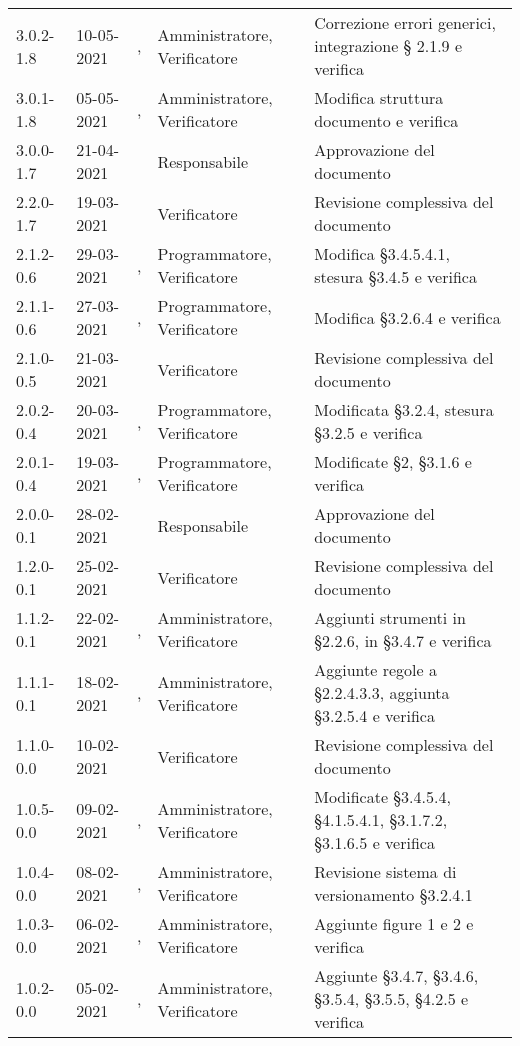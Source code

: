 {\begin{longtable}{C{1.7cm} | C{2.2cm} | C{3.2cm} | C{3cm} | C{4.8cm}}
3.0.2-1.8 & 10-05-2021 & \PA{}, \ZM{} & Amministratore, Verificatore & Correzione errori generici, integrazione \S{} 2.1.9 e verifica\\
3.0.1-1.8 & 05-05-2021 & \RA{}, \BM{} & Amministratore, Verificatore & Modifica struttura documento e verifica\\
3.0.0-1.7 & 21-04-2021 & \RA{} & Responsabile & Approvazione del documento \\
2.2.0-1.7 & 19-03-2021 & \SH{} & Verificatore & Revisione complessiva del documento \\
2.1.2-0.6 & 29-03-2021 & \SP{}, \RA{} & Programmatore, Verificatore & Modifica \S 3.4.5.4.1, stesura \S 3.4.5 e verifica \\
2.1.1-0.6 & 27-03-2021 & \PA{}, \BM{} & Programmatore, Verificatore & Modifica \S 3.2.6.4 e verifica \\
2.1.0-0.5 & 21-03-2021 & \SG{} & Verificatore & Revisione complessiva del documento \\
2.0.2-0.4 & 20-03-2021 & \RA{}, \SH{} & Programmatore, Verificatore & Modificata \S 3.2.4, stesura \S 3.2.5 e verifica \\
2.0.1-0.4 & 19-03-2021 & \BM{}, \PA{} & Programmatore, Verificatore & Modificate \S 2, \S 3.1.6 e verifica \\
2.0.0-0.1 & 28-02-2021 & \Approvatore{} & Responsabile & Approvazione del documento \\
1.2.0-0.1 & 25-02-2021 & \SG{} & Verificatore & Revisione complessiva del documento \\
1.1.2-0.1 & 22-02-2021 & \PA{}, \SP{} & Amministratore, Verificatore & Aggiunti strumenti in \S 2.2.6, in \S 3.4.7 e verifica \\
1.1.1-0.1 & 18-02-2021 & \RA{}, \BM{} & Amministratore, Verificatore & Aggiunte regole a \S 2.2.4.3.3, aggiunta \S 3.2.5.4 e verifica \\
1.1.0-0.0 & 10-02-2021 & \SG{} & Verificatore & Revisione complessiva del documento \\
1.0.5-0.0 & 09-02-2021 & \ZM{}, \SP{} & Amministratore, Verificatore & Modificate \S 3.4.5.4, \S 4.1.5.4.1, \S 3.1.7.2, \S 3.1.6.5 e verifica \\
1.0.4-0.0 & 08-02-2021 & \PA{}, \SP{} & Amministratore, Verificatore & Revisione sistema di versionamento \S 3.2.4.1\\
1.0.3-0.0 & 06-02-2021 & \SH{}, \SP{} & Amministratore, Verificatore & Aggiunte figure 1 e 2 e verifica \\
1.0.2-0.0 & 05-02-2021 & \PA{}, \BM{} & Amministratore, Verificatore & Aggiunte \S 3.4.7, \S 3.4.6, \S 3.5.4, \S 3.5.5, \S 4.2.5 e verifica \\

\end{longtable}}
